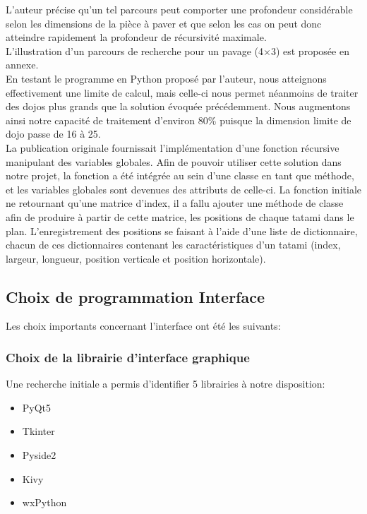 L’auteur précise qu’un tel parcours peut comporter une profondeur considérable selon les dimensions de la pièce
à paver et que selon les cas on peut donc atteindre rapidement la profondeur de récursivité maximale.\\

L'illustration d'un parcours de recherche pour un pavage (4$\times$3) est proposée en annexe.\\


En testant le programme en Python proposé par l’auteur, nous atteignons effectivement une limite de calcul,
mais celle-ci nous permet néanmoins de traiter des dojos plus grands que la solution évoquée précédemment.
Nous augmentons ainsi notre capacité de traitement d’environ 80\% puisque la dimension limite de dojo passe de 16 à 25.\\

La publication originale fournissait l’implémentation d’une fonction récursive manipulant des variables globales.
Afin de pouvoir utiliser cette solution dans notre projet, la fonction a été intégrée au sein d’une classe en tant que méthode,
et les variables globales sont devenues des attributs de celle-ci. La fonction initiale ne retournant qu’une matrice d’index,
il a fallu ajouter une méthode de classe afin de produire à partir de cette matrice, les positions de chaque tatami dans le plan.
L’enregistrement des positions se faisant à l’aide d’une liste de dictionnaire, chacun de ces dictionnaires contenant
les caractéristiques d’un tatami (index, largeur, longueur, position verticale et position horizontale).



\subsection{Choix de programmation Interface}

Les choix importants concernant l’interface ont été les suivants:


\subsubsection{Choix de la librairie d’interface graphique}

Une recherche initiale a permis d'identifier 5 librairies à notre disposition:

\begin{itemize}
    \item PyQt5
    \item Tkinter
    \item Pyside2
    \item Kivy
    \item wxPython
\end{itemize}

